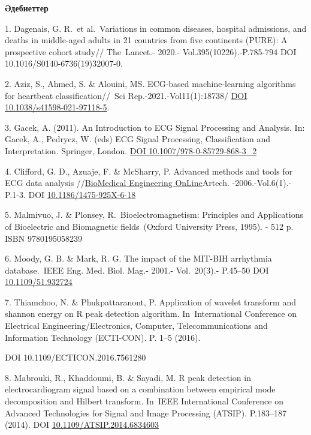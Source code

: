 \documentclass[
]{article}
\begin{document}
\textbf{Әдебиеттер}

1. Dagenais, G. R.~et al.~Variations in common diseases, hospital
admissions, and deaths in middle-aged adults in 21 countries from five
continents (PURE): A prospective cohort study// The~Lancet.- 2020.-
Vol.395(10226).-P.785-794 DOI 10.1016/S0140-6736(19)32007-0.

2. Aziz, S., Ahmed, S. \& Alouini, MS. ECG-based machine-learning
algorithms for heartbeat classification//~Sci Rep.-2021.-Vol11(1):18738/
\href{https://doi.org/10.1038/s41598-021-97118-5}{DOI
10.1038/s41598-021-97118-5}.

3. Gacek, A. (2011). An Introduction to ECG Signal Processing and
Analysis. In: Gacek, A., Pedrycz, W. (eds) ECG Signal Processing,
Classification and Interpretation. Springer, London.
\href{https://doi.org/10.1007/978-0-85729-868-3_2}{DOI
10.1007/978-0-85729-868-3\_2}

4. Clifford, G. D., Azuaje, F. \& McSharry, P. Advanced methods and
tools for ECG data analysis
//\href{https://www.researchgate.net/journal/BioMedical-Engineering-OnLine-1475-925X?_tp=eyJjb250ZXh0Ijp7ImZpcnN0UGFnZSI6InB1YmxpY2F0aW9uIiwicGFnZSI6InB1YmxpY2F0aW9uIn19}{BioMedical
Engineering OnLine}Artech. -2006.-Vol.6(1).- P.1-3. DOI
\href{http://dx.doi.org/10.1186/1475-925X-6-18}{10.1186/1475-925X-6-18}

5. Malmivuo, J. \& Plonsey, R.~Bioelectromagnetism: Principles and
Applications of Bioelectric and Biomagnetic fields~(Oxford University
Press, 1995). - 512 p. ISBN 9780195058239

6. Moody, G. B. \& Mark, R. G. The impact of the MIT-BIH arrhythmia
database.~IEEE Eng. Med. Biol. Mag.- 2001.- Vol.~20(3).- P.45--50 DOI
\href{https://doi.org/10.1109/51.932724}{10.1109/51.932724}

7. Thiamchoo, N. \& Phukpattaranont, P. Application of wavelet transform
and shannon energy on R peak detection algorithm. In~International
Conference on Electrical Engineering/Electronics, Computer,
Telecommunications and Information Technology (ECTI-CON). P. 1--5
(2016).

DOI 10.1109/ECTICON.2016.7561280

8. Mabrouki, R., Khaddoumi, B. \& Sayadi, M. R peak detection in
electrocardiogram signal based on a combination between empirical mode
decomposition and Hilbert transform. In~IEEE International Conference on
Advanced Technologies for Signal and Image Processing (ATSIP).
P.183--187 (2014). DOI
\href{http://dx.doi.org/10.1109\%2FATSIP.2014.6834603}{10.1109/ATSIP.2014.6834603}
\end{document}
